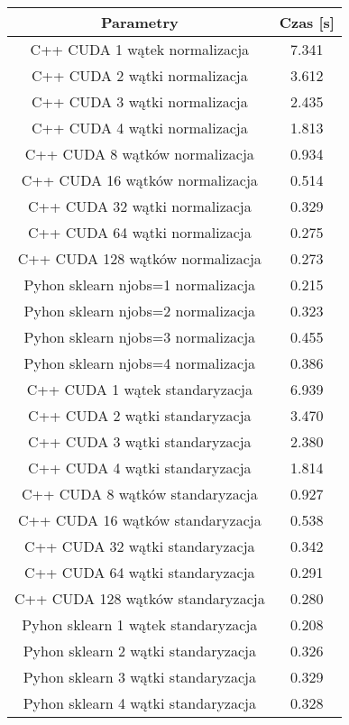 \documentclass[a4paper,11pt]{article}
\begin{document}
\paragraph{}
\begin{tabular}{|c|c|}
\hline Parametry&Czas [s] \\ 
\hline C++ CUDA 1 wątek normalizacja& 7.341 \\
\hline C++ CUDA 2 wątki normalizacja& 3.612 \\
\hline C++ CUDA 3 wątki normalizacja& 2.435  \\
\hline C++ CUDA 4 wątki normalizacja& 1.813 \\
\hline C++ CUDA 8 wątków normalizacja& 0.934 \\
\hline C++ CUDA 16 wątków normalizacja& 0.514 \\
\hline C++ CUDA 32 wątki normalizacja& 0.329  \\
\hline C++ CUDA 64 wątki normalizacja& 0.275 \\
\hline C++ CUDA 128 wątków normalizacja& 
0.273 \\\hline
\hline Pyhon sklearn njobs=1 normalizacja& 0.215 \\
\hline Pyhon sklearn njobs=2 normalizacja& 0.323 \\
\hline Pyhon sklearn njobs=3 normalizacja& 0.455 \\
\hline Pyhon sklearn njobs=4 normalizacja& 0.386 \\\hline
\hline C++ CUDA 1 wątek standaryzacja& 6.939 \\
\hline C++ CUDA 2 wątki standaryzacja& 3.470 \\
\hline C++ CUDA 3 wątki standaryzacja& 2.380  \\
\hline C++ CUDA 4 wątki standaryzacja& 1.814 \\
\hline C++ CUDA 8 wątków standaryzacja& 0.927 \\
\hline C++ CUDA 16 wątków standaryzacja& 0.538 \\
\hline C++ CUDA 32 wątki standaryzacja& 0.342  \\
\hline C++ CUDA 64 wątki standaryzacja& 0.291 \\
\hline C++ CUDA 128 wątków standaryzacja& 0.280 \\
\hline
\hline Pyhon sklearn 1 wątek standaryzacja& 0.208 \\
\hline Pyhon sklearn 2 wątki standaryzacja& 0.326 \\
\hline Pyhon sklearn 3 wątki standaryzacja& 0.329 \\
\hline Pyhon sklearn 4 wątki standaryzacja& 0.328 \\\hline
\end{tabular}
\end{document}
